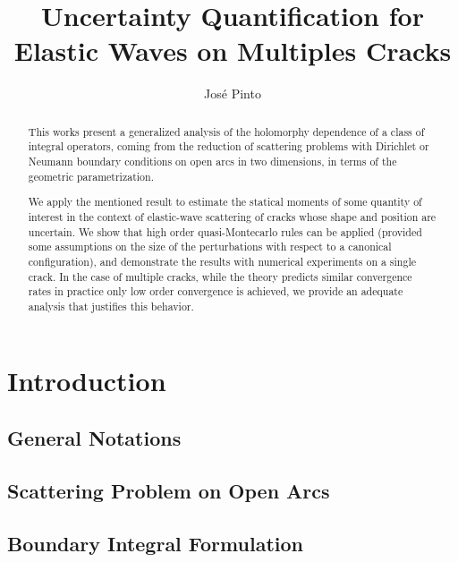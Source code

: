 \documentclass{article}
\title{Uncertainty Quantification for Elastic Waves on Multiples Cracks}
\author{Jos\'e Pinto}
\begin{document}
\maketitle

\begin{abstract}
 This works present a generalized analysis of the holomorphy dependence of a class of integral operators, coming from the reduction of scattering problems with Dirichlet or Neumann boundary conditions on open arcs in two dimensions,  in terms of the geometric parametrization. 

We apply the mentioned result to estimate the statical moments of some quantity of interest in the context of elastic-wave scattering of cracks whose shape and position are uncertain. We show that high order quasi-Montecarlo rules can be applied (provided some assumptions on the size of the perturbations with respect to a canonical configuration), and demonstrate the results with numerical experiments on a single crack. In the case of multiple cracks, while the theory predicts similar convergence rates in practice only low order convergence is achieved, we provide an adequate analysis that justifies this behavior. 
\end{abstract}

\section{Introduction}
\subsection{General Notations}
\subsection{Scattering Problem on Open Arcs}

\subsection{Boundary Integral Formulation}
\end{document}
